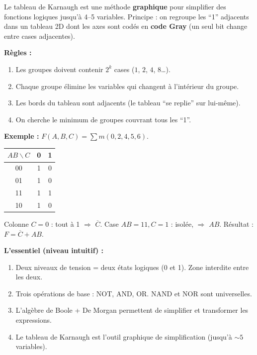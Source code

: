 \documentclass[12pt,a4paper,twoside]{book}
\begin{document}
\begin{pratique}
Le tableau de Karnaugh est une méthode \textbf{graphique} pour simplifier des fonctions logiques jusqu'à 4--5 variables. Principe : on regroupe les ``1'' adjacents dans un tableau 2D dont les axes sont codés en \textbf{code Gray} (un seul bit change entre cases adjacentes).

\textbf{Règles :}
\begin{enumerate}[nosep]
\item Les groupes doivent contenir $2^k$ cases ($1$, $2$, $4$, $8$\ldots).
\item Chaque groupe élimine les variables qui changent à l'intérieur du groupe.
\item Les bords du tableau sont adjacents (le tableau ``se replie'' sur lui-même).
\item On cherche le minimum de groupes couvrant tous les ``1''.
\end{enumerate}

\textbf{Exemple :} $F(A,B,C) = \sum m(0,2,4,5,6)$.

\begin{center}
\begin{tabular}{c|cc}
$AB \backslash C$ & 0 & 1 \\
\hline
00 & 1 & 0 \\
01 & 1 & 0 \\
11 & 1 & 1 \\
10 & 1 & 0 \\
\end{tabular}
\end{center}

Colonne $C=0$ : tout à 1 $\Rightarrow$ $\overline{C}$. Case $AB=11, C=1$ : isolée, $\Rightarrow$ $AB$. Résultat : $F = \overline{C} + AB$.
\end{pratique}

\begin{retenir}
\textbf{L'essentiel (niveau intuitif) :}
\begin{enumerate}[nosep]
\item Deux niveaux de tension = deux états logiques (0 et 1). Zone interdite entre les deux.
\item Trois opérations de base : NOT, AND, OR. NAND et NOR sont universelles.
\item L'algèbre de Boole + De Morgan permettent de simplifier et transformer les expressions.
\item Le tableau de Karnaugh est l'outil graphique de simplification (jusqu'à $\sim 5$ variables).
\end{enumerate}
\end{retenir}
\end{document}
